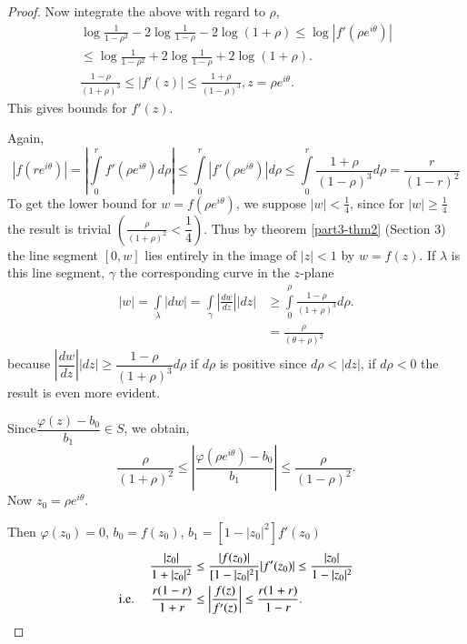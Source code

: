 \begin{proof}
Now integrate the above with regard to $\rho$, 
\begin{gather*}
\log\frac{1}{1-\rho^{2}}-2\log \frac{1}{1-\rho}-2\log (1+\rho)\leq
\log|f'(\rho e^{i\theta})|\\
\leq \log \frac{1}{1-\rho^{2}}+2\log\frac{1}{1-\rho}+2\log (1+\rho).\\
\frac{1-\rho}{(1+\rho)^{3}}\leq |f'(z)|\leq
\frac{1+\rho}{(1-\rho)^{3}}, z=\rho e^{i\theta}.
\end{gather*}\pageoriginale
This gives bounds for $f'(z)$.

Again,
\begin{equation*}
|f(re^{i\theta})|=\left|\int\limits^{r}_{0}f'(\rho e^{i\theta})d\rho
\right|\leq 
\int\limits^{r}_{0}|f'(\rho e^{i\theta})|d\rho\leq
\int\limits^{r}_{0}\frac{1+\rho}{(1-\rho)^{3}}d\rho=\frac{r}{(1-r)^{2}}
\end{equation*}
To get the lower bound for $w=f(\rho e^{i\theta})$, we suppose
$|w|<\frac{1}{4}$, since for $|w|\geq \frac{1}{4}$ the result is
trivial $\left(\frac{\rho}{(1+\rho)^{2}}<\dfrac{1}{4}\right)$. Thus by
theorem \ref{part3-thm2} (Section 3) the line segment $[0,w]$ lies
entirely in the image of $|z|<1$ by $w=f(z)$. If $\lambda$ is this
line segment, $\gamma$ the corresponding curve in the $z$-plane
\begin{align*}
|w|=\int\limits_{\lambda}|dw|=\int\limits_{\gamma}\left|\frac{dw}{dz}\right||dz|
&\geq \int\limits^{\rho}_{0}\frac{1-\rho}{(1+\rho)^{3}}d\rho.\\
&= \frac{\rho}{(\theta+\rho)^{2}} 
\end{align*}
because $\left|\dfrac{dw}{dz}\right||dz|\geq
\dfrac{1-\rho}{(1+\rho)^{3}}d\rho$ if $d\rho$ is positive since
$d\rho<|dz|$, if $d\rho<0$ the result is even more evident.

Since\pageoriginale $\dfrac{\varphi(z)-b_{0}}{b_{1}}\in S$, we obtain,
$$
\frac{\rho}{(1+\rho)^{2}}\leq \left|\frac{\varphi(\rho
  e^{i\theta})-b_{0}}{b_{1}}\right|\leq \frac{\rho}{(1-\rho)^{2}}.  
$$
Now $z_{0}=\rho e^{i\theta}$.

Then $\varphi(z_0)=0$, $b_{0}=f(z_{0})$,
$b_{1}=[1-|z_{0}|^{2}]f'(z_{0})$
\begin{align*}
\frac{|z_{0}|}{1+|z_{0}|^{2}} &\leq
\frac{|f(z_{0})|}{[1-|z_{0}|^{2}]}|f'(z_{0})|\leq
\frac{|z_{0}|}{1-|z_{0}|^{2}}\\
\text{{i.e.}\kern.3em\quad }\frac{r(1-r)}{1+r} &\leq
\left|\frac{f(z)}{f'(z)}\right|\leq \frac{r(1+r)}{1-r}. 
\end{align*}
\end{proof}

